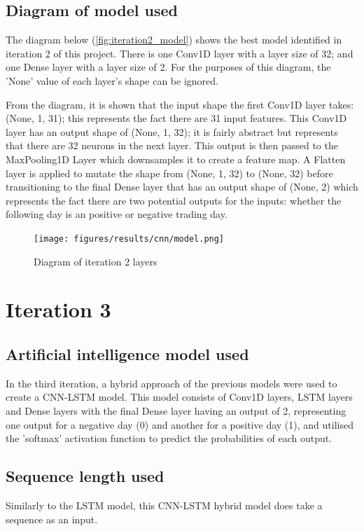 \subsection{Diagram of model used}
The diagram below (\autoref{fig:iteration2_model}) shows the best model identified in iteration 2 of this project.
There is one Conv1D layer with a layer size of 32; and one Dense layer with a layer size of 2.
For the purposes of this diagram, the 'None' value of each layer's shape can be ignored.

From the diagram, it is shown that the input shape the first Conv1D layer takes: (None, 1, 31); this represents the
fact there are 31 input features.  This Conv1D layer has an output shape of (None, 1, 32); it is fairly abstract
but represents that there are 32 neurons in the next layer. This output is then passed to the MaxPooling1D Layer
which downsamples it to create a feature map. A Flatten layer is applied to mutate the shape from (None, 1, 32) to
(None, 32) before transitioning to the final Dense layer that has an output shape of (None, 2)
which represents the fact there are two potential outputs for the inputs: whether the following day
is an positive or negative trading day.

\begin{figure}[ht]
    \centering
    \texttt{[image: figures/results/cnn/model.png]}
    \caption[Diagram of iteration 2 layers]{Diagram of iteration 2 layers}
    \label{fig:iteration2_model}
\end{figure}
\FloatBarrier

\section{Iteration 3}
\subsection{Artificial intelligence model used}\label{ssec:iteration3_ai_model}
In the third iteration, a hybrid approach of the previous models were used to create a CNN-LSTM model.
This model consists of Conv1D layers, LSTM layers and Dense layers with the final Dense layer having an output of 2, representing one output for
a negative day (0) and another for a positive day (1), and utilised the 'softmax' activation function to predict the
probabilities of each output.

\subsection{Sequence length used}
Similarly to the LSTM model, this CNN-LSTM hybrid model does take a sequence as an input.

